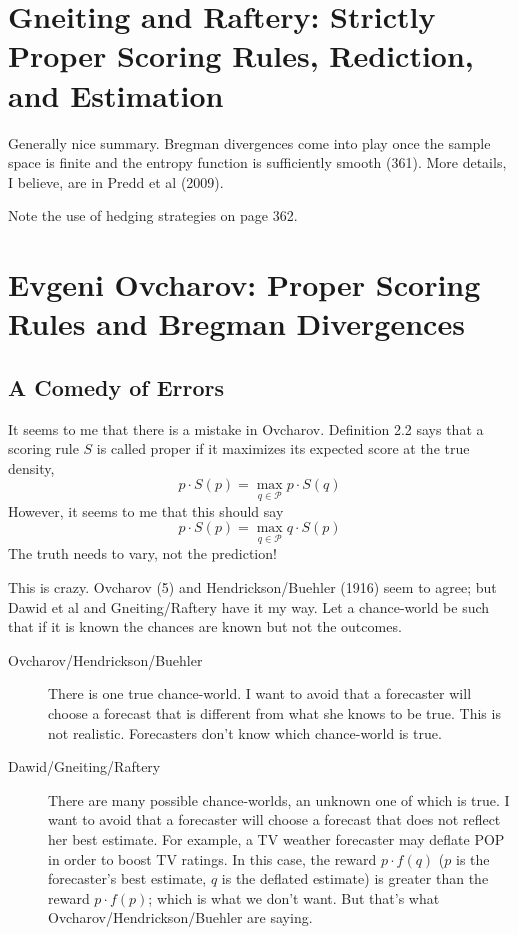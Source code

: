 \documentclass[12pt]{article}
\begin{document}
\section{Gneiting and Raftery: Strictly Proper Scoring Rules,
  Rediction, and Estimation}
\label{section:faokuoju}

Generally nice summary. Bregman divergences come into play once the
sample space is finite and the entropy function is sufficiently smooth
(361). More details, I believe, are in Predd et al (2009). 

Note the use of hedging strategies on page 362. 

\section{Evgeni Ovcharov: Proper Scoring Rules and Bregman Divergences}
\label{section:eitooshe}

\subsection{A Comedy of Errors}
\label{subsection:iegaecee}

It seems to me that there is a mistake in Ovcharov. Definition 2.2
says that a scoring rule $S$ is called proper if it maximizes its
expected score at the true density,
\begin{equation}
  \label{eq:iemieder}
  p\cdot{}S(p)=\max_{q\in\mathcal{P}}p\cdot{}S(q)
\end{equation}
However, it seems to me that this should say
\begin{equation}
  \label{eq:ieweiphi}
  p\cdot{}S(p)=\max_{q\in\mathcal{P}}q\cdot{}S(p)
\end{equation}
The truth needs to vary, not the prediction!

This is crazy. Ovcharov (5) and Hendrickson/Buehler (1916) seem to agree; but
Dawid et al and Gneiting/Raftery have it my way. Let a chance-world be
such that if it is known the chances are known but not the outcomes.

\begin{description}
\item[Ovcharov/Hendrickson/Buehler] There is one true chance-world. I
  want to avoid that a forecaster will choose a forecast that is
  different from what she knows to be true. This is not realistic.
  Forecasters don't know which chance-world is true.
\item[Dawid/Gneiting/Raftery] There are many possible chance-worlds,
  an unknown one of which is true. I want to avoid that a forecaster
  will choose a forecast that does not reflect her best estimate. For
  example, a TV weather forecaster may deflate POP in order to boost
  TV ratings. In this case, the reward $p\cdot{}f(q)$ ($p$ is the
  forecaster's best estimate, $q$ is the deflated estimate) is greater
  than the reward $p\cdot{}f(p)$; which is what we don't want. But
  that's what Ovcharov/Hendrickson/Buehler are saying.
\end{description}
\end{document}
